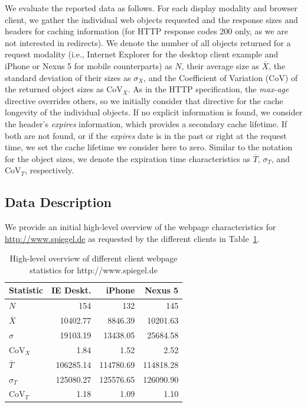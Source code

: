 \documentclass[letterpaper,journal,onecolumn,draftcls]{IEEEtran}
\begin{document}
We evaluate the reported data as follows. For each display modality and browser client, we gather the individual web objects requested and the response sizes and headers for caching information (for HTTP response codes 200 only, as we are not interested in redirects).
We denote the number of all objects returned for a request modality (i.e., Internet Explorer for the desktop client example and iPhone or Nexus 5 for mobile counterparts) as $N$, their average size as $\overline{X}$, the standard deviation of their sizes as ${\sigma}_{X}$, and the Coefficient of Variation (CoV) of the returned object sizes as $\mathrm{CoV}_{X}$. As in the HTTP specification, the \emph{max-age} directive overrides others, so we initially consider that directive for the cache longevity of the individual objects. If no explicit information is found, we consider the header's \emph{expires} information, which provides a secondary cache lifetime. If both are not found, or if the \emph{expires} date is in the past or right at the request time, we set the cache lifetime we consider here to zero. 
Similar to the notation for the object sizes, we denote the expiration time characteristics as $\overline{T}$, $\sigma_{T}$, and $\mathrm{CoV}_{T}$, respectively.


\subsection{Data Description}

We provide an initial high-level overview of the webpage characteristics for \url{http://www.spiegel.de} as requested by the different clients in Table~\ref{tab:spiegel}.
\begin{table}
\centering
\caption{High-level overview of different client webpage statistics for http://www.spiegel.de}
\label{tab:spiegel}
\begin{tabular}{|l|r|r|r|}
	\hline
	Statistic          & IE Deskt. &    iPhone &   Nexus 5 \\ \hline
	$N$                &       154 &       132 &       145 \\ \hline\hline
	$\overline{X}$     &  10402.77 &   8846.39 &  10201.63 \\ \hline
	$\sigma$           &  19103.19 &  13438.05 &  25684.58 \\ \hline
	$\mathrm{CoV}_{X}$ &      1.84 &      1.52 &      2.52 \\ \hline\hline
	$\overline{T}$     & 106285.14 & 114780.69 & 114818.28 \\ \hline
	$\sigma_{T}$       & 125080.27 & 125576.65 & 126090.90 \\ \hline
	$\mathrm{CoV}_{T}$ &      1.18 &      1.09 &      1.10 \\ \hline
\end{tabular}
\end{table}
\end{document}
